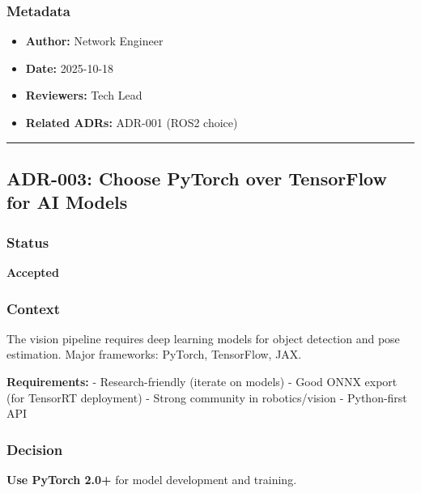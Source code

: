 \documentclass[
]{article}
\providecommand{\tightlist}{%
  \setlength{\itemsep}{0pt}\setlength{\parskip}{0pt}}
\begin{document}
\hypertarget{metadata-1}{%
\subsubsection{Metadata}\label{metadata-1}}

\begin{itemize}
\tightlist
\item
  \textbf{Author:} Network Engineer
\item
  \textbf{Date:} 2025-10-18
\item
  \textbf{Reviewers:} Tech Lead
\item
  \textbf{Related ADRs:} ADR-001 (ROS2 choice)
\end{itemize}

\begin{center}\rule{0.5\linewidth}{0.5pt}\end{center}

\hypertarget{adr-003-choose-pytorch-over-tensorflow-for-ai-models}{%
\subsection{ADR-003: Choose PyTorch over TensorFlow for AI
Models}\label{adr-003-choose-pytorch-over-tensorflow-for-ai-models}}

\hypertarget{status-2}{%
\subsubsection{Status}\label{status-2}}

\textbf{Accepted}

\hypertarget{context-2}{%
\subsubsection{Context}\label{context-2}}

The vision pipeline requires deep learning models for object detection
and pose estimation. Major frameworks: PyTorch, TensorFlow, JAX.

\textbf{Requirements:} - Research-friendly (iterate on models) - Good
ONNX export (for TensorRT deployment) - Strong community in
robotics/vision - Python-first API

\hypertarget{decision-2}{%
\subsubsection{Decision}\label{decision-2}}

\textbf{Use PyTorch 2.0+} for model development and training.
\end{document}
